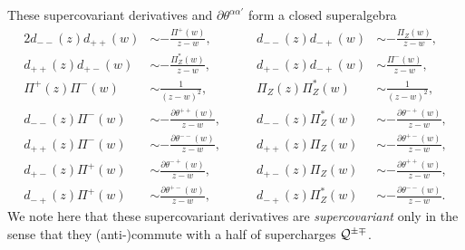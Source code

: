 \documentclass[a4paper,seceq,preprint]{ptptex}
\begin{document}
These supercovariant derivatives and 
$\partial\theta^{\alpha\alpha'}$ form 
a closed superalgebra
\begin{alignat}{2}
 d_{--}(z)d_{++}(w)&\sim
-\frac{\Pi^+(w)}{z-w},&\qquad
 d_{--}(z)d_{-+}(w)&\sim 
-\frac{\Pi_Z(w)}{z-w},\nonumber\\
d_{++}(z)d_{+-}(w)&\sim
-\frac{\Pi^*_Z(w)}{z-w},&\qquad
d_{+-}(z)d_{-+}(w)&\sim
\frac{\Pi^-(w)}{z-w},\nonumber\\
\Pi^+(z)\Pi^-(w)&\sim
\frac{1}{(z-w)^2},&\qquad
\Pi_Z(z)\Pi^*_Z(w)&\sim
\frac{1}{(z-w)^2},\nonumber\\
d_{--}(z)\Pi^-(w)&\sim
-\frac{\partial\theta^{++}(w)}{z-w},&\qquad
d_{--}(z)\Pi^*_Z(w)&\sim
-\frac{\partial\theta^{-+}(w)}{z-w},\nonumber\\
d_{++}(z)\Pi^-(w)&\sim
-\frac{\partial\theta^{--}(w)}{z-w},&\qquad
d_{++}(z)\Pi_Z(w)&\sim
-\frac{\partial\theta^{+-}(w)}{z-w},\nonumber\\
d_{+-}(z)\Pi^+(w)&\sim
\frac{\partial\theta^{-+}(w)}{z-w},&\qquad
d_{+-}(z)\Pi_Z(w)&\sim
-\frac{\partial\theta^{++}(w)}{z-w},\nonumber\\
d_{-+}(z)\Pi^+(w)&\sim
\frac{\partial\theta^{+-}(w)}{z-w},&\qquad
d_{-+}(z)\Pi^*_Z(w)&\sim
-\frac{\partial\theta^{--}(w)}{z-w}.
\end{alignat}
We note here that these supercovariant derivatives 
are {\it supercovariant} only in the sense that they 
(anti-)commute with a half of supercharges ${\cal Q}^{\pm\mp}$.
\end{document}
